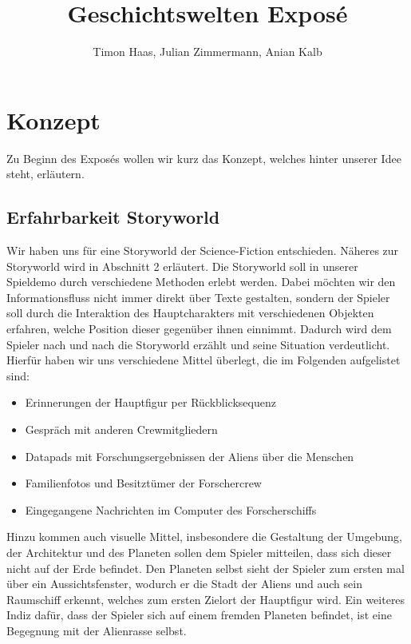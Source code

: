 \documentclass[12pt]{article}
\title{Geschichtswelten Exposé}
\author{Timon Haas, Julian Zimmermann, Anian Kalb}
\date{}
\begin{document}
	\maketitle
	\tableofcontents
	\newpage
	\section{Konzept}
	\linenumbers
		Zu Beginn des Exposés wollen wir kurz das Konzept, welches hinter unserer Idee steht, erläutern.
	\subsection{Erfahrbarkeit Storyworld}
		Wir haben uns für eine Storyworld der Science-Fiction entschieden. Näheres zur Storyworld wird in Abschnitt 2 erläutert.\newline
		Die Storyworld soll in unserer Spieldemo durch verschiedene Methoden erlebt werden. Dabei möchten wir den Informationsfluss nicht immer direkt über Texte gestalten, sondern der Spieler soll durch die Interaktion des Hauptcharakters mit verschiedenen Objekten erfahren, welche Position dieser gegenüber ihnen einnimmt. Dadurch wird dem Spieler nach und nach die Storyworld erzählt und seine Situation verdeutlicht. Hierfür haben wir uns verschiedene Mittel überlegt, die im Folgenden aufgelistet sind:
		\begin{itemize}
			\item Erinnerungen der Hauptfigur per Rückblicksequenz
			\item Gespräch mit anderen Crewmitgliedern
			\item Datapads mit Forschungsergebnissen der Aliens über die Menschen
			\item Familienfotos und Besitztümer der Forschercrew
			\item Eingegangene Nachrichten im Computer des Forscherschiffs
		\end{itemize}
		Hinzu kommen auch visuelle Mittel, insbesondere die Gestaltung der Umgebung, der Architektur und des Planeten sollen dem Spieler mitteilen, dass sich dieser nicht auf der Erde befindet. Den Planeten selbst sieht der Spieler zum ersten mal über ein Aussichtsfenster, wodurch er die Stadt der Aliens und auch sein Raumschiff erkennt, welches zum ersten Zielort der Hauptfigur wird. Ein weiteres Indiz dafür, dass der Spieler sich auf einem fremden Planeten befindet, ist eine Begegnung mit der Alienrasse selbst.
\end{document}
